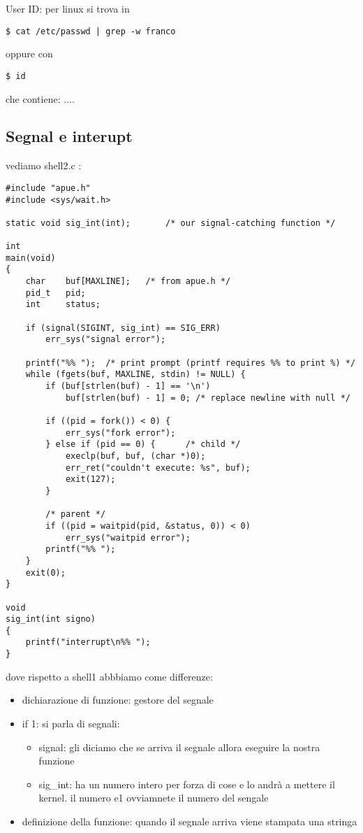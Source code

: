 User ID: per linux si trova in 

\begin{lstlisting}
$ cat /etc/passwd | grep -w franco
\end{lstlisting}

oppure con 

\begin{lstlisting}
$ id
\end{lstlisting}

che contiene: ....


\subsection{Segnal e interupt}

vediamo shell2.c :

\begin{lstlisting}
#include "apue.h"
#include <sys/wait.h>

static void	sig_int(int);		/* our signal-catching function */

int
main(void)
{
	char	buf[MAXLINE];	/* from apue.h */
	pid_t	pid;
	int		status;

	if (signal(SIGINT, sig_int) == SIG_ERR)
		err_sys("signal error");

	printf("%% ");	/* print prompt (printf requires %% to print %) */
	while (fgets(buf, MAXLINE, stdin) != NULL) {
		if (buf[strlen(buf) - 1] == '\n')
			buf[strlen(buf) - 1] = 0; /* replace newline with null */

		if ((pid = fork()) < 0) {
			err_sys("fork error");
		} else if (pid == 0) {		/* child */
			execlp(buf, buf, (char *)0);
			err_ret("couldn't execute: %s", buf);
			exit(127);
		}

		/* parent */
		if ((pid = waitpid(pid, &status, 0)) < 0)
			err_sys("waitpid error");
		printf("%% ");
	}
	exit(0);
}

void
sig_int(int signo)
{
	printf("interrupt\n%% ");
}
\end{lstlisting}

dove rispetto a shell1 abbbiamo come differenze:

\begin{itemize}
	\item dichiarazione di funzione: gestore del segnale
	\item if 1: si parla di segnali:
		
		\begin{itemize}
			\item signal: gli diciamo che se arriva il segnale allora eseguire la nostra funzione
			\item sig_int: ha un numero intero per forza di cose e lo andrà a mettere il kernel. il numero e1 ovviamnete il numero del sengale
		\end{itemize}
	\item definizione della funzione: quando il segnale arriva viene stampata una stringa
\end{itemize}

